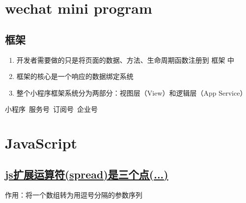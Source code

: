 \documentclass[a4paper, 12pt]{article}
\begin{document}
\section{wechat mini program}
\subsection{框架}
\begin{enumerate}

\item 开发者需要做的只是将页面的数据、方法、生命周期函数注册到 框架 中

\item 框架的核心是一个响应的数据绑定系统
\item 整个小程序框架系统分为两部分：视图层（View）和逻辑层（App Service）
\end{enumerate}

\vspace{2in}
小程序~服务号~订阅号~企业号

\section{JavaScript}

\subsection{\href{https://www.cnblogs.com/wangyunhui/p/7511615.html}{js扩展运算符(spread)是三个点(...)}}
作用：将一个数组转为用逗号分隔的参数序列
\end{document}
